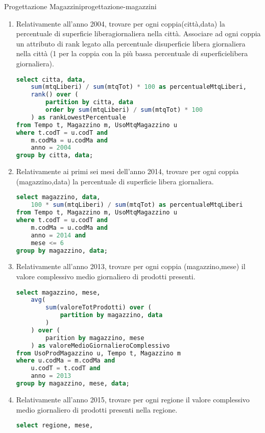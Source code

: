 \documentclass[12pt]{article}
\begin{document}
\begin{problem}{Progettazione Magazzini}{progettazione-magazzini}
\begin{enumerate}
\begin{lstlisting}[language=sql]
from UsoProdMagazzino u, Tempo t, Magazzino m
where u.codT = t.codT and
    u.codMa = m.codMa and
    citta = 'torino' and
    anno = 2013 and
    3m = 1
group by magazzino, data;
\end{lstlisting}
        \item Relativamente all’anno 2004, trovare per ogni coppia(città,data) la percentuale di superficie liberagiornaliera nella città. Associare ad ogni coppia un attributo di rank legato alla percentuale disuperficie libera giornaliera nella città (1 per la coppia con la più bassa percentuale di superficielibera giornaliera).
\begin{lstlisting}[language=sql]
select citta, data,
    sum(mtqLiberi) / sum(mtqTot) * 100 as percentualeMtqLiberi,
    rank() over (
        partition by citta, data
        order by sum(mtqLiberi) / sum(mtqTot) * 100
    ) as rankLowestPercentuale
from Tempo t, Magazzino m, UsoMtqMagazzino u
where t.codT = u.codT and
    m.codMa = u.codMa and
    anno = 2004
group by citta, data;
\end{lstlisting}
        \item Relativamente ai primi sei mesi dell’anno 2014, trovare per ogni coppia (magazzino,data) la percentuale di superficie libera giornaliera.
\begin{lstlisting}[language=sql]
select magazzino, data,
    100 * sum(mtqLiberi) / sum(mtqTot) as percentualeMtqLiberi
from Tempo t, Magazzino m, UsoMtqMagazzino u
where t.codT = u.codT and
    m.codMa = u.codMa and
    anno = 2014 and
    mese <= 6
group by magazzino, data;
\end{lstlisting}
        \item Relativamente all’anno 2013, trovare per ogni coppia (magazzino,mese) il valore complessivo medio giornaliero di prodotti presenti.
\begin{lstlisting}[language=sql]
select magazzino, mese,
    avg(
        sum(valoreTotProdotti) over (
            partition by magazzino, data
        )
    ) over (
        parition by magazzino, mese
    ) as valoreMedioGiornalieroComplessivo
from UsoProdMagazzino u, Tempo t, Magazzino m
where u.codMa = m.codMa and
    u.codT = t.codT and
    anno = 2013
group by magazzino, mese, data;
\end{lstlisting}
        \item Relativamente all’anno 2015, trovare per ogni regione il valore complessivo medio giornaliero di prodotti presenti nella regione.
\begin{lstlisting}[language=sql]
select regione, mese,

\end{lstlisting}
\end{enumerate}
\end{problem}
\end{document}
